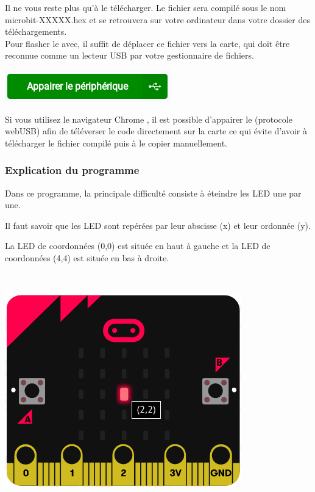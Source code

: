 Il ne vous reste plus qu'à le télécharger. Le fichier sera compilé sous le nom microbit-XXXXX.hex et se retrouvera sur votre ordinateur dans votre dossier des téléchargements.\\
Pour flasher le \mb avec, il suffit de déplacer ce fichier vers la carte, qui doit être reconnue comme un lecteur USB par votre gestionnaire de fichiers.


\begin{remarque}

\includegraphics[width=0.2\linewidth]{res/mb-makecode_BtnAppairer.png}

Si vous utilisez le navigateur Chrome \textregistered, il est possible d'appairer le \mb (protocole webUSB) afin de téléverser le code directement sur la carte ce qui évite d'avoir à télécharger le fichier compilé puis à le copier manuellement.
\end{remarque}


\subsubsection{Explication du programme}

\begin{minipage}[t]{0.75\linewidth}

Dans ce programme, la principale difficulté consiste à éteindre les LED une par une.

Il faut savoir que les LED sont repérées par leur abscisse (x) et leur ordonnée (y).

La LED de coordonnées (0,0) est située en haut à gauche et la LED de coordonnées (4,4) est située en bas à droite.
\end{minipage}
\hfill
\begin{minipage}[t]{0.25\linewidth}~\\
  \vspace{-2mm}
  \begin{center}
    \includegraphics[scale=0.3]{res/mb-makecode_reperageLED.png}
  \end{center}
\end{minipage}


